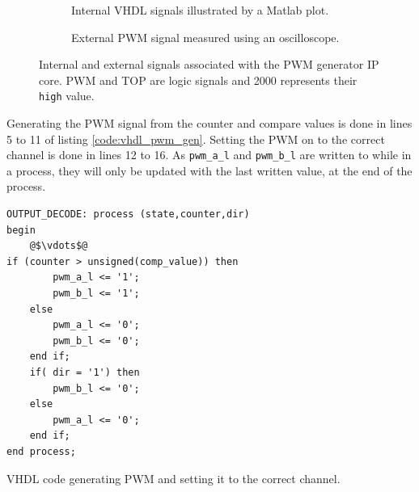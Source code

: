 \begin{figure}
    \centering
    \begin{subfigure}[b]{0.45\textwidth}
        \caption{Internal VHDL signals illustrated by a Matlab plot.}
        \label{sfig:pwm_gen_int}
    \end{subfigure}
    \begin{subfigure}[b]{0.45\textwidth}
        \caption{External PWM signal measured using an oscilloscope. }
        \label{sfig:pwm_gen_ext}
    \end{subfigure}
    \caption[Signals associated with the PWM generator IP core]{Internal and external signals associated with the PWM generator IP core. PWM and TOP are logic signals and 2000 represents their \texttt{high} value.}
    \label{fig:vhdl_pwm_gen}
\end{figure}

Generating the PWM signal from the counter and compare values is done in lines 5 to 11 of listing \ref{code:vhdl_pwm_gen}.
Setting the PWM on to the correct channel is done in lines 12 to 16.
As \texttt{pwm\_a\_l} and \texttt{pwm\_b\_l} are written to while in a process, they will only be updated with the last written value, at the end of the process.

\begin{listing}[!h]
\begin{verbatim}
OUTPUT_DECODE: process (state,counter,dir)
begin
	@$\vdots$@
if (counter > unsigned(comp_value)) then
		pwm_a_l <= '1';
		pwm_b_l <= '1';
	else
		pwm_a_l <= '0';
		pwm_b_l <= '0';
	end if;	
	if( dir = '1') then 
		pwm_b_l <= '0';
	else 
		pwm_a_l <= '0';	
	end if;
end process;		
\end{verbatim}
\caption[VHDL code generating PWM signals.]{VHDL code generating PWM and setting it to the correct channel.}
\label{code:vhdl_pwm_gen}
\end{listing}


